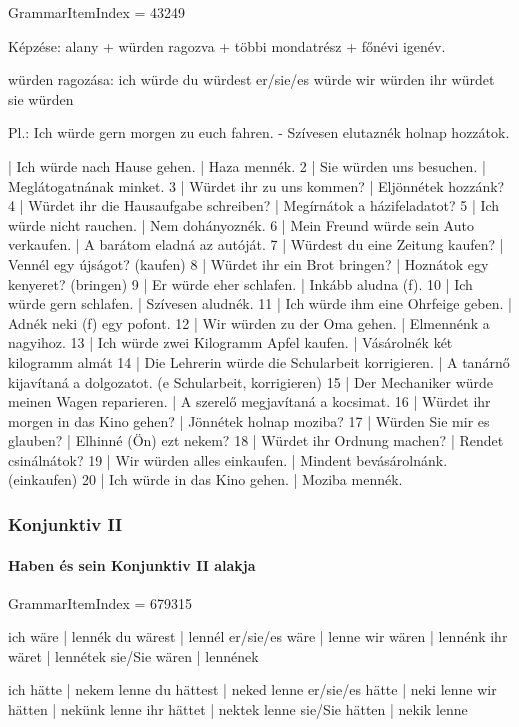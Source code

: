 \documentclass{article}
\newenvironment{desc}{\verbatim}{\endverbatim}
\newenvironment{exmp}{\verbatim}{\endverbatim}
\begin{document}
GrammarItemIndex = 43249

\begin{desc}
Képzése: alany + würden ragozva + többi mondatrész + főnévi igenév.

würden ragozása:
ich würde
du würdest
er/sie/es würde
wir würden
ihr würdet
sie würden

Pl.: Ich würde gern morgen zu euch fahren. - Szívesen elutaznék holnap hozzátok.
\end{desc}

\begin{exmp}
1 | Ich würde nach Hause gehen. | Haza mennék.
2 | Sie würden uns besuchen. | Meglátogatnának minket.
3 | Würdet ihr zu uns kommen? | Eljönnétek hozzánk?
4 | Würdet ihr die Hausaufgabe schreiben? | Megírnátok a házifeladatot?
5 | Ich würde nicht rauchen. | Nem dohányoznék.
6 | Mein Freund würde sein Auto verkaufen. | A barátom eladná az autóját.
7 | Würdest du eine Zeitung kaufen? | Vennél egy újságot? (kaufen)
8 | Würdet ihr ein Brot bringen? | Hoznátok egy kenyeret? (bringen)
9 | Er würde eher schlafen. | Inkább aludna (f).
10 | Ich würde gern schlafen. | Szívesen aludnék.
11 | Ich würde ihm eine Ohrfeige geben. | Adnék neki (f) egy pofont.
12 | Wir würden zu der Oma gehen. | Elmennénk a nagyihoz.
13 | Ich würde zwei Kilogramm Apfel kaufen. | Vásárolnék két kilogramm almát
14 | Die Lehrerin würde die Schularbeit korrigieren. | A tanárnő kijavítaná a dolgozatot. (e Schularbeit, korrigieren)
15 | Der Mechaniker würde meinen Wagen reparieren. | A szerelő megjavítaná a kocsimat.
16 | Würdet ihr morgen in das Kino gehen? | Jönnétek holnap moziba?
17 | Würden Sie mir es glauben? | Elhinné (Ön) ezt nekem?
18 | Würdet ihr Ordnung machen? | Rendet csinálnátok?
19 | Wir würden alles einkaufen. | Mindent bevásárolnánk. (einkaufen)
20 | Ich würde in das Kino gehen. | Moziba mennék.
\end{exmp}

\subsubsection{Konjunktiv II}

\paragraph{Haben és sein Konjunktiv II alakja}

GrammarItemIndex = 679315

\begin{desc}
ich wäre       | lennék
du wärest      | lennél
er/sie/es wäre | lenne
wir wären      | lennénk
ihr wäret      | lennétek
sie/Sie wären  | lennének

ich hätte       | nekem lenne
du hättest      | neked lenne
er/sie/es hätte | neki lenne
wir hätten      | nekünk lenne
ihr hättet      | nektek lenne
sie/Sie hätten  | nekik lenne
\end{desc}
\end{document}
